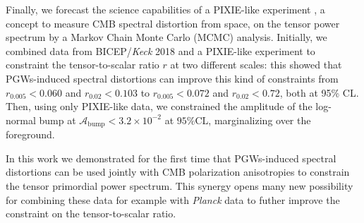 \begin{adjustwidth}{1cm}{1cm}
Finally, we forecast the science capabilities of a PIXIE-like experiment \cite{A_Kogut_2011}, a concept to measure CMB spectral distortion from space, on the tensor power spectrum by a Markov Chain Monte Carlo (MCMC) analysis. Initially, we combined data from BICEP/\textit{Keck} 2018 \cite{Ade_2021} and a PIXIE-like experiment to constraint the tensor-to-scalar ratio $r$ at two different scales: this showed that PGWs-induced spectral distortions can improve this kind of constraints from $r_{0.005}<0.060$ and $r_{0.02}< 0.103$ to $r_{0.005}<0.072$ and $r_{0.02}< 0.72$, both at 95\% CL. Then, using only PIXIE-like data, we constrained the amplitude of the log-normal bump at $\mathcal{A}_\text{bump}<3.2\times10^{-2}$ at $ 95\%$CL, marginalizing over the foreground.

In this work we demonstrated for the first time that PGWs-induced spectral distortions can be used jointly with CMB polarization anisotropies to constrain the tensor primordial power spectrum. This synergy opens many new possibility for combining these data for example with \emph{Planck} data to futher improve the constraint on the tensor-to-scalar ratio.
\end{adjustwidth}